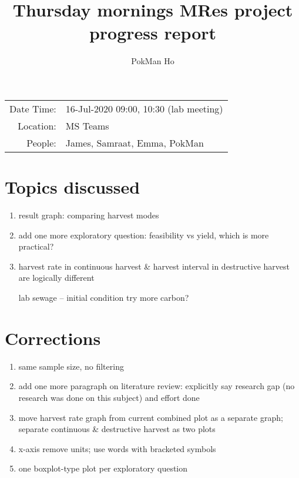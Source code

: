 \documentclass[a4paper,11pt]{article}
\title{Thursday mornings MRes project progress report}
\author{PokMan Ho}
\date{}
\begin{document}
    \maketitle
    
    \begin{tabular}{rl}
        Date Time: & 16-Jul-2020 09:00, 10:30 (lab meeting) \\
        Location: & MS Teams \\
        People: & James, Samraat, Emma, PokMan \\
    \end{tabular}
    
    \section{Topics discussed}
    \begin{enumerate}
        \item result graph: comparing harvest modes
        \item add one more exploratory question: feasibility vs yield, which is more practical?
        \item harvest rate in continuous harvest \& harvest interval in destructive harvest are logically different
        \item [lab] sewage -- initial condition try more carbon?
    \end{enumerate}
    
    \section{Corrections}
    \begin{enumerate}
        \item same sample size, no filtering
        \item add one more paragraph on literature review: explicitly say research gap (no research was done on this subject) and effort done
        \item move harvest rate graph from current combined plot as a separate graph; separate continuous \& destructive harvest as two plots
        \item x-axis remove units; use words with bracketed symbols
        \item one boxplot-type plot per exploratory question
    \end{enumerate}
    
\end{document}

